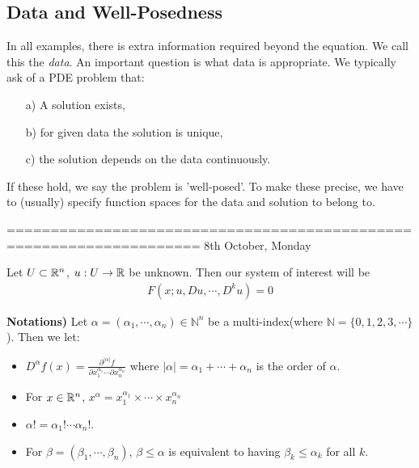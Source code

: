 \documentclass[12pt,a4paper]{report}
\begin{document}
\subsection*{Data and Well-Posedness}
In all examples, there is extra information required beyond the equation. We call this the \emph{data}. An important question is what data is appropriate. We typically ask of a PDE problem that:
\begin{itemize}
\item[a)] A solution exists,
\item[b)] for given data the solution is unique,
\item[c)] the solution depends on the data continuously.
\end{itemize}
If these hold, we say the problem is 'well-posed'. To make these precise, we have to (usually) specify function spaces for the data and solution to belong to.
\s

====================================================================
8th October, Monday
\s

Let $U \subset \mathbb{R}^n$, $u: U \rightarrow \mathbb{R}$ be unknown. Then our system of interest will be
\begin{align}
F(x; u,Du,\cdots, D^k u)=0 \label{thePDE}
\end{align}
\s

\textbf{Notations) } Let $\alpha = (\alpha_1, \cdots, \alpha_n) \in \mathbb{N}^n$ be a multi-index(where $\mathbb{N} =\{ 0,1,2,3,\cdots\}$). Then we let:
\begin{itemize}
\item $D^{\alpha}f(x) = \frac{\partial^{| \alpha |} f}{\partial x_1^{\alpha_1} \cdots \partial x_n^{\alpha_n}}$ where $|\alpha| = \alpha_1 + \cdots + \alpha_n$ is the order of $\alpha$.
\item For $x \in \mathbb{R}^n$, $x^{\alpha} = x_1^{\alpha_1} \times \cdots \times x_n^{\alpha_n}$
\item $\alpha! = \alpha_1! \cdots \alpha_n!$.
\item For $\beta = (\beta_1, \cdots, \beta_n)$, $\beta \leq \alpha$ is equivalent to having $\beta_k \leq \alpha_k$ for all $k$.
\end{itemize}
\s
\end{document}
